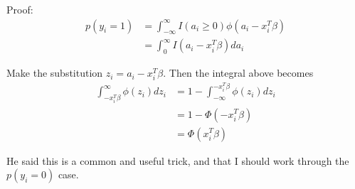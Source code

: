\documentclass{amsart}
\begin{document}
Proof:
\begin{align*}
p(y_i = 1) &= \int_{-\infty}^{\infty} I(a_i \geq 0) \phi(a_i - x_i^T \beta) \\
&= \int_{0}^{\infty} I(a_i - x_i^T \beta) d a_i
\end{align*}

Make the substitution $z_i = a_i - x_i^T \beta$. Then the integral above becomes
\begin{align*}
\int_{-x_i^T \beta}^{\infty} \phi(z_i) d z_i
&= 1 - \int_{-\infty}^{-x_i^T \beta} \phi(z_i) d z_i \\
&= 1 - \Phi(-x_i^T \beta) \\
&= \Phi(x_i^T \beta)
\end{align*}

He said this is a common and useful trick, and that I should work through the
$p(y_i = 0)$ case.
\end{document}
